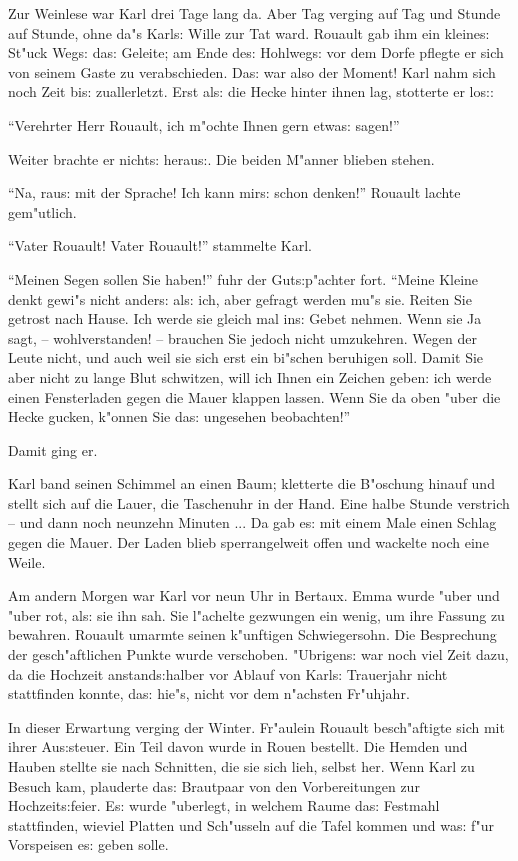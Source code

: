 \documentclass[oneside,12pt]{book}
\newcommand{\s}{s:}%
\begin{document}
Zur Weinlese war Karl drei Tage lang da. Aber Tag verging auf Tag
und Stunde auf Stunde, ohne da"s Karl{\s} Wille zur Tat ward.
Rouault gab ihm ein kleine{\s} St"uck Weg{\s} da{\s} Geleite; am
Ende de{\s} Hohlweg{\s} vor dem Dorfe pflegte er sich von seinem
Gaste zu verabschieden. Da{\s} war also der Moment! Karl nahm sich
noch Zeit bi{\s} zuallerletzt. Erst al{\s} die Hecke hinter ihnen
lag, stotterte er lo{\s}:

"`Verehrter Herr Rouault, ich m"ochte Ihnen gern etwa{\s} sagen!"'

Weiter brachte er nicht{\s} herau{\s}. Die beiden M"anner blieben
stehen.

"`Na, rau{\s} mit der Sprache! Ich kann mir{\s} schon denken!"'
Rouault lachte gem"utlich.

"`Vater Rouault! Vater Rouault!"' stammelte Karl.

"`Meinen Segen sollen Sie haben!"' fuhr der Gut{\s}p"achter fort.
"`Meine Kleine denkt gewi"s nicht ander{\s} al{\s} ich, aber
gefragt werden mu"s sie. Reiten Sie getrost nach Hause. Ich werde
sie gleich mal in{\s} Gebet nehmen. Wenn sie Ja sagt, --
wohlverstanden! -- brauchen Sie jedoch nicht umzukehren. Wegen der
Leute nicht, und auch weil sie sich erst ein bi"schen beruhigen
soll. Damit Sie aber nicht zu lange Blut schwitzen, will ich Ihnen
ein Zeichen geben: ich werde einen Fensterladen gegen die Mauer
klappen lassen. Wenn Sie da oben "uber die Hecke gucken, k"onnen
Sie da{\s} ungesehen beobachten!"'

Damit ging er.

Karl band seinen Schimmel an einen Baum; kletterte die B"oschung
hinauf und stellt sich auf die Lauer, die Taschenuhr in der Hand.
Eine halbe Stunde verstrich -- und dann noch neunzehn Minuten ...
Da gab e{\s} mit einem Male einen Schlag gegen die Mauer. Der
Laden blieb sperrangelweit offen und wackelte noch eine Weile.

Am andern Morgen war Karl vor neun Uhr in Bertaux. Emma wurde
"uber und "uber rot, al{\s} sie ihn sah. Sie l"achelte gezwungen
ein wenig, um ihre Fassung zu bewahren. Rouault umarmte seinen
k"unftigen Schwiegersohn. Die Besprechung der gesch"aftlichen
Punkte wurde verschoben. "Ubrigen{\s} war noch viel Zeit dazu, da
die Hochzeit anstand{\s}halber vor Ablauf von Karl{\s} Trauerjahr
nicht stattfinden konnte, da{\s} hie"s, nicht vor dem n"achsten
Fr"uhjahr.

In dieser Erwartung verging der Winter. Fr"aulein Rouault
besch"aftigte sich mit ihrer Au{\s}steuer. Ein Teil davon wurde in
Rouen bestellt. Die Hemden und Hauben stellte sie nach Schnitten,
die sie sich lieh, selbst her. Wenn Karl zu Besuch kam, plauderte
da{\s} Brautpaar von den Vorbereitungen zur Hochzeit{\s}feier.
E{\s} wurde "uberlegt, in welchem Raume da{\s} Festmahl
stattfinden, wieviel Platten und Sch"usseln auf die Tafel kommen
und wa{\s} f"ur Vorspeisen e{\s} geben solle.
\end{document}
